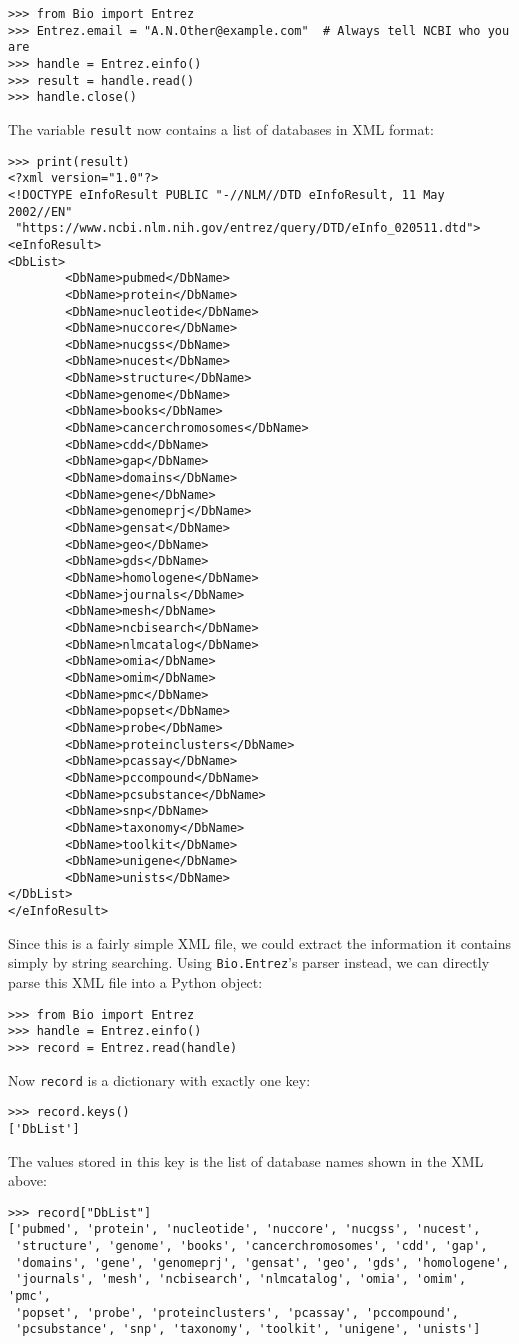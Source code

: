 \begin{verbatim}
>>> from Bio import Entrez
>>> Entrez.email = "A.N.Other@example.com"  # Always tell NCBI who you are
>>> handle = Entrez.einfo()
>>> result = handle.read()
>>> handle.close()
\end{verbatim}
The variable \verb+result+ now contains a list of databases in XML format:
\begin{verbatim}
>>> print(result)
<?xml version="1.0"?>
<!DOCTYPE eInfoResult PUBLIC "-//NLM//DTD eInfoResult, 11 May 2002//EN"
 "https://www.ncbi.nlm.nih.gov/entrez/query/DTD/eInfo_020511.dtd">
<eInfoResult>
<DbList>
        <DbName>pubmed</DbName>
        <DbName>protein</DbName>
        <DbName>nucleotide</DbName>
        <DbName>nuccore</DbName>
        <DbName>nucgss</DbName>
        <DbName>nucest</DbName>
        <DbName>structure</DbName>
        <DbName>genome</DbName>
        <DbName>books</DbName>
        <DbName>cancerchromosomes</DbName>
        <DbName>cdd</DbName>
        <DbName>gap</DbName>
        <DbName>domains</DbName>
        <DbName>gene</DbName>
        <DbName>genomeprj</DbName>
        <DbName>gensat</DbName>
        <DbName>geo</DbName>
        <DbName>gds</DbName>
        <DbName>homologene</DbName>
        <DbName>journals</DbName>
        <DbName>mesh</DbName>
        <DbName>ncbisearch</DbName>
        <DbName>nlmcatalog</DbName>
        <DbName>omia</DbName>
        <DbName>omim</DbName>
        <DbName>pmc</DbName>
        <DbName>popset</DbName>
        <DbName>probe</DbName>
        <DbName>proteinclusters</DbName>
        <DbName>pcassay</DbName>
        <DbName>pccompound</DbName>
        <DbName>pcsubstance</DbName>
        <DbName>snp</DbName>
        <DbName>taxonomy</DbName>
        <DbName>toolkit</DbName>
        <DbName>unigene</DbName>
        <DbName>unists</DbName>
</DbList>
</eInfoResult>
\end{verbatim}

Since this is a fairly simple XML file, we could extract the information it contains simply by string searching. Using \verb+Bio.Entrez+'s parser instead, we can directly parse this XML file into a Python object:

\begin{verbatim}
>>> from Bio import Entrez
>>> handle = Entrez.einfo()
>>> record = Entrez.read(handle)
\end{verbatim}
Now \verb+record+ is a dictionary with exactly one key:
\begin{verbatim}
>>> record.keys()
['DbList']
\end{verbatim}
The values stored in this key is the list of database names shown in the XML above:
\begin{verbatim}
>>> record["DbList"]
['pubmed', 'protein', 'nucleotide', 'nuccore', 'nucgss', 'nucest',
 'structure', 'genome', 'books', 'cancerchromosomes', 'cdd', 'gap',
 'domains', 'gene', 'genomeprj', 'gensat', 'geo', 'gds', 'homologene',
 'journals', 'mesh', 'ncbisearch', 'nlmcatalog', 'omia', 'omim', 'pmc',
 'popset', 'probe', 'proteinclusters', 'pcassay', 'pccompound',
 'pcsubstance', 'snp', 'taxonomy', 'toolkit', 'unigene', 'unists']
\end{verbatim}

